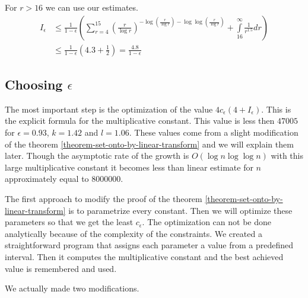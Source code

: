 For $r > 16$ we can use our estimates.
\begin{displaymath}
\begin{split}
I_{\epsilon} 
	& \leq \frac{1}{1 - \epsilon} \left( \displaystyle \sum_{r = 4}^{15} \left(\frac{r}{\log r}\right)^{-\log \left(\frac{r}{\log r}\right) - \log \log \left(\frac{r}{\log r}\right)} + \int\limits_{16}^\infty \frac{1}{r^{1.5}} dr \right) \\
	& \leq \frac{1}{1 - \epsilon} \left(4.3 + \frac{1}{2}\right) = \frac{4.8}{1-\epsilon}
\end{split}
\end{displaymath}

\subsection{Choosing $\epsilon$}
The most important step is the optimization of the value $4 c_\epsilon (4 + I_{\epsilon})$. This is the explicit formula for the multiplicative constant. This value is less then $47 005$ for $\epsilon = 0.93$, $k = 1.42$ and $l = 1.06$. These values come from a slight modification of the theorem \ref{theorem-set-onto-by-linear-transform} and we will explain them later. Though the asymptotic rate of the growth is $O(\log n \log \log n)$ with this large multiplicative constant it becomes less than linear estimate for $n$ approximately equal to $8 000 000$.

The first approach to modify the proof of the theorem \ref{theorem-set-onto-by-linear-transform} is to parametrize every constant. Then we will optimize these parameters so that we get the least $c_{\epsilon}$. The optimization can not be done analytically because of the complexity of the constraints. We created a straightforward program that assigns each parameter a value from a predefined interval. Then it computes the multiplicative constant and the best achieved value is remembered and used.

We actually made two modifications. 

